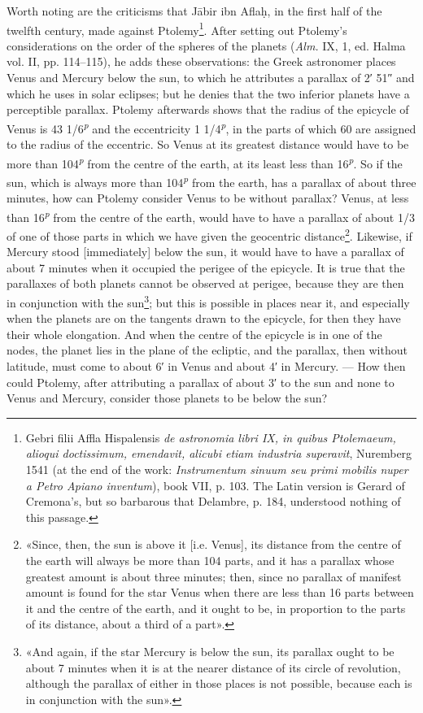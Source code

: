 \documentclass[11pt]{article}
\newcommand{\Pg}[1]{\marginpar{\footnotesize\color{gray}#1}}
\begin{document}
\par \Pg{I 253}Worth noting are the criticisms that Jābir ibn Aflaḥ, in the first half of the twelfth century, made against Ptolemy\footnote{Gebri filii Affla Hispalensis \emph{de astronomia libri IX, in quibus Ptolemaeum, alioqui doctissimum, emendavit, alicubi etiam industria superavit}, Nuremberg 1541 (at the end of the work: \emph{Instrumentum sinuum seu primi mobilis nuper a Petro Apiano inventum}), book VII, p. 103. The Latin version is Gerard of Cremona's, but so barbarous that Delambre, p. 184, understood nothing of this passage.}. After setting out Ptolemy's considerations on the order of the spheres of the planets (\emph{Alm.} IX, 1, ed. Halma vol. II, pp. 114–115), he adds these observations: the Greek astronomer places Venus and Mercury below the sun, to which he attributes a parallax of 2′ 51″ and which he uses in solar eclipses; but he denies that the two inferior planets have a perceptible parallax. Ptolemy afterwards shows that the radius of the epicycle of Venus is 43 1/6\textsuperscript{\itshape p} and the eccentricity 1 1/4\textsuperscript{\itshape p}, in the parts of which 60 are assigned to the radius of the eccentric. So Venus at its greatest distance would have to be more than 104\textsuperscript{\itshape p} from the centre of the earth, at its least less than 16\textsuperscript{\itshape p}. So if the sun, which is always more than 104\textsuperscript{\itshape p} from the earth, has a parallax of about three minutes, how can Ptolemy consider Venus to be without parallax? Venus, at less than 16\textsuperscript{\itshape p} from the centre of the earth, would have to have a parallax of about 1/3 of one of those parts in which we have given the geocentric distance\footnote{«Since, then, the sun is above it [i.e. Venus], its distance from the centre of the earth will always be more than 104 parts, and it has a parallax whose greatest amount is about three minutes; then, since no parallax of manifest amount is found for the star Venus when there are less than 16 parts between it and the centre of the earth, and it ought to be, in proportion to the parts of its distance, about a third of a part».}. Likewise, if Mercury stood [immediately] below the sun, it would have to have a parallax of about 7 minutes when it occupied the perigee of the epicycle. It is true that the parallaxes of both planets cannot be observed at perigee, because they are then in conjunction with the sun\footnote{«And again, if the star Mercury is below the sun, its parallax ought to be about 7 minutes when it is at the nearer distance of its circle of revolution, although the parallax of either in those places is not possible, because each is in conjunction with the sun».}; but this is possible in places near it, and especially when the planets are on the tangents drawn to the epicycle, for then they have their whole elongation. And when the centre of the epicycle is in one of the nodes, the planet lies in the plane of the ecliptic, and the parallax, then without latitude, must come to about 6′ in Venus and about 4′ in Mercury. — How then could Ptolemy, after attributing a parallax of about 3′ to the sun and none to Venus and Mercury, consider those planets to be below the sun?\par
\end{document}
